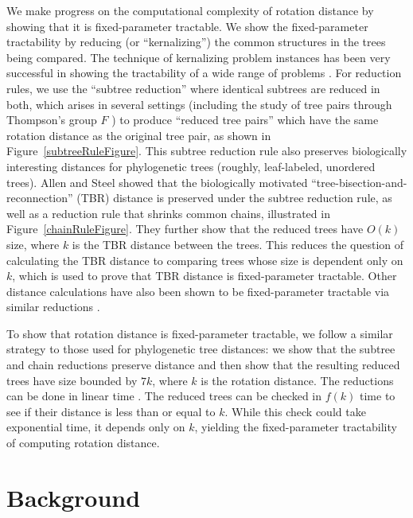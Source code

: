 \documentclass[12pt]{article}
\begin{document}
We
make progress on the computational complexity of rotation distance by showing that it
is fixed-parameter tractable.  
We show the fixed-parameter tractability by reducing (or ``kernalizing'') the
common structures in the trees being compared.  
The technique of kernalizing problem instances has been very successful in 
showing the tractability of a wide range of problems \cite{Fellows2006a,Guo2007a}.
For
reduction rules, we use the ``subtree reduction'' where
identical subtrees are reduced in both, which arises in several settings
(including the study of tree pairs through Thompson's group $F$
\cite{rotbound, rotipl, rightarm}) to produce ``reduced tree pairs''  which have 
 the same rotation distance as 
the original tree pair, as shown in Figure~\ref{subtreeRuleFigure}.  This subtree
reduction rule also preserves biologically interesting
distances for phylogenetic trees (roughly, leaf-labeled,
unordered trees).  Allen and Steel \cite{allenSteel} 
showed that the biologically motivated ``tree-bisection-and-reconnection'' (TBR)
distance is preserved under the subtree reduction
rule, as well as a reduction rule that shrinks common chains,
illustrated in Figure~\ref{chainRuleFigure}.
They further show that the reduced trees have
$O(k)$  size, where $k$ is the TBR distance between the
trees.  This reduces the question of calculating the 
TBR distance to comparing trees whose size is 
dependent only on $k$, which is used to prove that TBR distance 
is fixed-parameter tractable.  Other distance calculations
have also been shown to be fixed-parameter tractable
via similar reductions \cite{uSPRfpt,bordewichSemple,Bordewich2007}.

To show that rotation distance is fixed-parameter
tractable, we follow a similar strategy to those used
for phylogenetic tree distances:  we show that the
subtree and chain reductions preserve distance
and then show that the resulting reduced trees have size 
bounded by $7k$, 
where $k$ is the rotation distance.  The
reductions can be done in linear time \cite{approx}.  
The reduced
trees can be checked in $f(k)$ time to see if their
distance is less than or equal to $k$.  While this check 
could take exponential time, it depends only
on $k$, yielding the fixed-parameter tractability of computing
rotation distance.


\section{Background}
\end{document}
